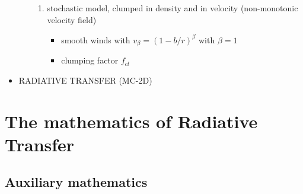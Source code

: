 \documentclass[../main/main.tex]{subfiles}
\begin{document}
\begin{itemize}
\begin{itemize}
\begin{enumerate}
\item stochastic model, clumped in density and in velocity (non-monotonic velocity field)
\begin{itemize}
\item smooth winds with $v_{\beta} = (1-b/r)^{\beta}$ with $\beta = 1$
\item clumping factor $f_{cl}$
\end{itemize}
\end{enumerate}

\end{itemize}

\item RADIATIVE TRANSFER (MC-2D)

\end{itemize}



\newpage
\section{The mathematics of Radiative Transfer}
\subsection{Auxiliary mathematics}
\end{document}
